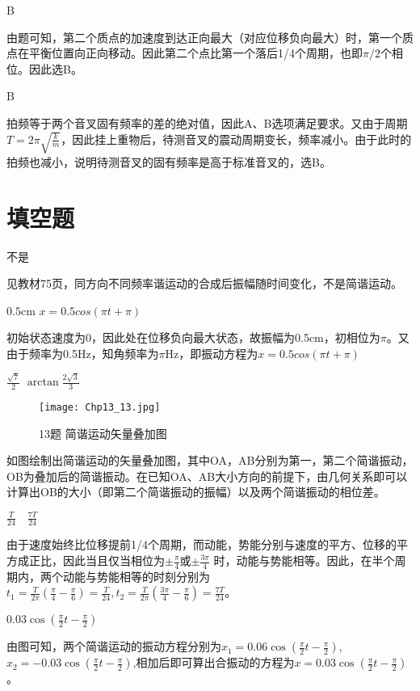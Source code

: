 \exercise B

\solve 
由题可知，第二个质点的加速度到达正向最大（对应位移负向最大）时，第一个质点在平衡位置向正向移动。因此第二个点比第一个落后1/4个周期，也即$\pi/2$个相位。因此选B。

\exercise B

\solve
拍频等于两个音叉固有频率的差的绝对值，因此A、B选项满足要求。又由于周期$T=2\pi\sqrt{\frac{k}{m}}$，因此挂上重物后，待测音叉的震动周期变长，频率减小。由于此时的拍频也减小，说明待测音叉的固有频率是高于标准音叉的，选B。

\section{填空题}
\exercise 不是

\solve 
见教材75页，同方向不同频率谐运动的合成后振幅随时间变化，不是简谐运动。

\exercise $0.5\mathrm{cm}$ \quad $x=0.5cos(\pi t+\pi)$

\solve
初始状态速度为0，因此处在位移负向最大状态，故振幅为0.5cm，初相位为$\pi$。又由于频率为0.5Hz，知角频率为$\pi$Hz，即振动方程为$x=0.5cos(\pi t+\pi)$
 
\exercise $\frac{\sqrt{7}}{2}$ \quad $\arctan{\frac{2\sqrt{3}}{3}}$

\solve
\begin{figure}[htbp]
\centering
\texttt{[image: Chp13\_13.jpg]}
\caption{13题 简谐运动矢量叠加图}
\end{figure}
如图绘制出简谐运动的矢量叠加图，其中OA，AB分别为第一，第二个简谐振动，OB为叠加后的简谐振动。在已知OA、AB大小方向的前提下，由几何关系即可以计算出OB的大小（即第二个简谐振动的振幅）以及两个简谐振动的相位差。

\exercise $\frac{T}{24} \quad \frac{7T}{24}$

\solve
由于速度始终比位移提前1/4个周期，而动能，势能分别与速度的平方、位移的平方成正比，因此当且仅当相位为$\pm\frac{\pi}{4}$或$\pm\frac{3\pi}{4}$ 时，动能与势能相等。因此，在半个周期内，两个动能与势能相等的时刻分别为$t_1=\frac{T}{2\pi}\left(\frac{\pi}{4}-\frac{\pi}{6}\right)=\frac{T}{24}, t_2=\frac{T}{2\pi}\left(\frac{3\pi}{4}-\frac{\pi}{6}\right)=\frac{7T}{24}$。

\exercise $0.03\cos(\frac{\pi}{2}t-\frac{\pi}{2})$

\solve
由图可知，两个简谐运动的振动方程分别为$x_1=0.06\cos(\frac{\pi}{2}t-\frac{\pi}{2})$,$x_2=-0.03\cos(\frac{\pi}{2}t-\frac{\pi}{2})$,相加后即可算出合振动的方程为$x=0.03\cos(\frac{\pi}{2}t-\frac{\pi}{2})$。

